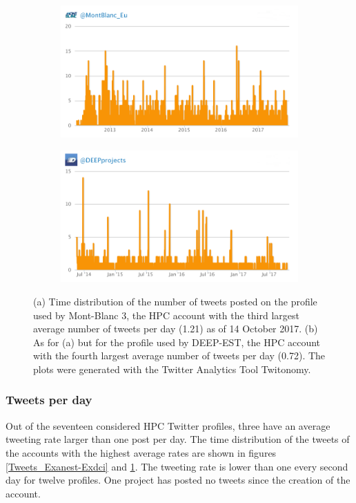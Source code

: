 \begin{figure}
 \centering
 \begin{subfigure}[t]{0.95\textwidth}
   \includegraphics[width=1\linewidth]{Images/Tweets_Montblanc.png}
   \caption{} 
 \end{subfigure}

 \begin{subfigure}[t]{0.95\textwidth}
   \includegraphics[width=1\linewidth]{Images/Tweets_Deepest.png}
   \caption{}
 \end{subfigure}
 \caption{(a) Time distribution of the number of tweets posted on the profile used by Mont-Blanc 3, the HPC account with the third largest average number of tweets per day (1.21) as of 14 October 2017. (b) As for (a) but for the profile used by DEEP-EST, the HPC account with the fourth largest average number of tweets per day (0.72). The plots were generated with the Twitter Analytics Tool Twitonomy.} 
 \label{Tweets_Montblanc-Deepest}
\end{figure}

\subsubsection{Tweets per day}
Out of the seventeen considered HPC Twitter profiles, three have an average tweeting rate larger than one post per day. The time distribution of the tweets of the accounts with the highest average rates are shown in figures \ref{Tweets_Exanest-Exdci} and \ref{Tweets_Montblanc-Deepest}. The tweeting rate is lower than one every second day for twelve profiles. One project has posted no tweets since the creation of the account. 

